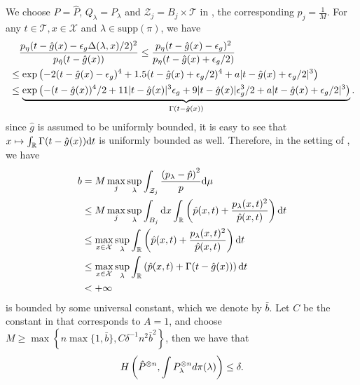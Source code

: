 \documentclass{article}
\def\eps{{\epsilon}}
\def\gT{{\mathcal{T}}}
\def\gX{{\mathcal{X}}}
\def\gZ{{\mathcal{Z}}}
\newcommand{\R}{\mathbb{R}}
\newcommand{\dd}{\textup{d}}
\begin{document}
We choose $P=\hat{P}$, $Q_{\lambda}=P_{\lambda}$ and $\gZ_j=B_j\times\gT$ in , the corresponding $p_j=\frac{1}{M}$. For any $t\in\gT,x\in\gX$ and $\lambda\in\mathrm{supp}(\pi)$, we have
\begin{equation}
    \notag
    \begin{aligned}
        &\quad \frac{p_{\eta}(t-\hat{g}(x)-\eps_g\Delta(\lambda,x)/2)^2}{p_{\hat{\eta}}(t-\hat{g}(x))} \leq \frac{p_{\eta}(t-\hat{g}(x)-\eps_g)^2}{p_{\eta}(t-\hat{g}(x)+\eps_g/2)} \\
        &\leq \exp\left(-2(t-\hat{g}(x)-\eps_g)^4+1.5(t-\hat{g}(x)+\eps_g/2)^4 + a|t-\hat{g}(x)+\eps_g/2|^3\right) \\
        &\leq \underbrace{\exp\left(-(t-\hat{g}(x))^4/2+11|t-\hat{g}(x)|^3\eps_g+9|t-\hat{g}(x)|\eps_g^3/2+ a|t-\hat{g}(x)+\eps_g/2|^3\right)}_{\Gamma(t-\hat{g}(x))}.
    \end{aligned}
\end{equation}
since $\hat{g}$ is assumed to be uniformly bounded, it is easy to see that $x\mapsto\int_{\R}\Gamma(t-\hat{g}(x))\dd t$ is uniformly bounded as well.
Therefore, in the setting of , we have
\begin{equation}
    \notag
    \begin{aligned}
        b &= M \max _j \sup _\lambda \int_{\gZ_j} \frac{\left(p_\lambda-\hat{p}\right)^2}{p} \dd \mu \\
        &\leq  M \max _j \sup _\lambda \int_{B_j} \dd x \int_{\R} \left(\hat{p}(x,t)+\frac{p_{\lambda}(x,t)^2}{\hat{p}(x,t)}\right)\dd t \\
        &\leq \max_{x\in\gX}\sup_{\lambda} \int_{\R} \left(\hat{p}(x,t)+\frac{p_{\lambda}(x,t)^2}{\hat{p}(x,t)}\right)\dd t \\
        &\leq \max_{x\in\gX}\sup_{\lambda} \int_{\R} \left(\hat{p}(x,t)+\Gamma(t-\hat{g}(x))\right)\dd t \\
        &< +\infty
    \end{aligned}
\end{equation}
is bounded by some universal constant, which we denote by $\bar{b}$. Let $C$ be the constant in  that corresponds to $A=1$, and choose $M \geq\max\left\{n\max\{1,\bar{b}\}, C\delta^{-1}n^2\bar{b}^2\right\}$, then we have that
\begin{equation}
    \notag
    H\left(\hat{P}^{\otimes n}, \int P_\lambda^{\otimes n} d \pi(\lambda)\right) \leq \delta.
\end{equation}
\end{document}
